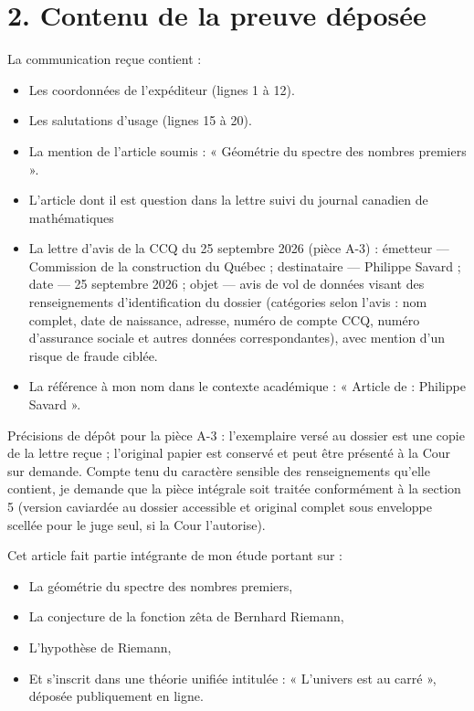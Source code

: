 \documentclass[12pt,a4paper]{article}
\begin{document}
\section*{2. Contenu de la preuve déposée}
La communication reçue contient :

\begin{itemize}
  \item Les coordonnées de l’expéditeur (lignes 1 à 12).
  \item Les salutations d’usage (lignes 15 à 20).
  \item La mention de l’article soumis : « Géométrie du spectre des nombres premiers ».
  \item L’article dont il est question dans la lettre suivi du journal canadien de mathématiques
  \item La lettre d’avis de la CCQ du 25 septembre 2026 (pièce A-3) : émetteur --- Commission de la construction du Québec ; destinataire --- Philippe Savard ; date --- 25 septembre 2026 ; objet --- avis de vol de données visant des renseignements d’identification du dossier (catégories selon l’avis : nom complet, date de naissance, adresse, numéro de compte CCQ, numéro d’assurance sociale et autres données correspondantes), avec mention d’un risque de fraude ciblée.
  \item La référence à mon nom dans le contexte académique : « Article de : Philippe Savard ».
\end{itemize}

Précisions de dépôt pour la pièce A-3 : l’exemplaire versé au dossier est une copie de la lettre reçue ; l’original papier est conservé et peut être présenté à la Cour sur demande. Compte tenu du caractère sensible des renseignements qu’elle contient, je demande que la pièce intégrale soit traitée conformément à la section 5 (version caviardée au dossier accessible et original complet sous enveloppe scellée pour le juge seul, si la Cour l’autorise).

Cet article fait partie intégrante de mon étude portant sur :

\begin{itemize}
  \item La géométrie du spectre des nombres premiers,
  \item La conjecture de la fonction zêta de Bernhard Riemann,
  \item L’hypothèse de Riemann,
  \item Et s’inscrit dans une théorie unifiée intitulée : « L’univers est au carré », déposée publiquement en ligne.
\end{itemize}
\end{document}
